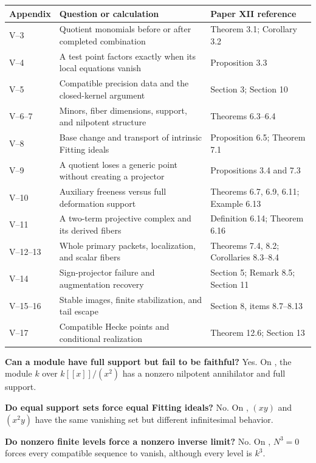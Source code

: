 {\small
\begin{tabularx}{\linewidth}{@{}p{.12\linewidth}Yp{.30\linewidth}@{}}\toprule
\textbf{Appendix} & \textbf{Question or calculation} & \textbf{Paper XII reference}\\\midrule
V--3 & Quotient monomials before or after completed combination & Theorem 3.1; Corollary 3.2\\
V--4 & A test point factors exactly when its local equations vanish & Proposition 3.3\\
V--5 & Compatible precision data and the closed-kernel argument & Section 3; Section 10\\
V--6--7 & Minors, fiber dimensions, support, and nilpotent structure & Theorems 6.3--6.4\\
V--8 & Base change and transport of intrinsic Fitting ideals & Proposition 6.5; Theorem 7.1\\
V--9 & A quotient loses a generic point without creating a projector & Propositions 3.4 and 7.3\\
V--10 & Auxiliary freeness versus full deformation support & Theorems 6.7, 6.9, 6.11; Example 6.13\\
V--11 & A two-term projective complex and its derived fibers & Definition 6.14; Theorem 6.16\\
V--12--13 & Whole primary packets, localization, and scalar fibers & Theorems 7.4, 8.2; Corollaries 8.3--8.4\\
V--14 & Sign-projector failure and augmentation recovery & Section 5; Remark 8.5; Section 11\\
V--15--16 & Stable images, finite stabilization, and tail escape & Section 8, items 8.7--8.13\\
V--17 & Compatible Hecke points and conditional realization & Theorem 12.6; Section 13\\\bottomrule
\end{tabularx}}

\textbf{Can a module have full support but fail to be faithful?} Yes. On , the module $k$ over $k[[x]]/(x^2)$ has a nonzero nilpotent annihilator and full support.

\textbf{Do equal support sets force equal Fitting ideals?} No. On , $(xy)$ and $(x^2y)$ have the same vanishing set but different infinitesimal behavior.

\textbf{Do nonzero finite levels force a nonzero inverse limit?} No. On , $N^3=0$ forces every compatible sequence to vanish, although every level is $k^3$.

